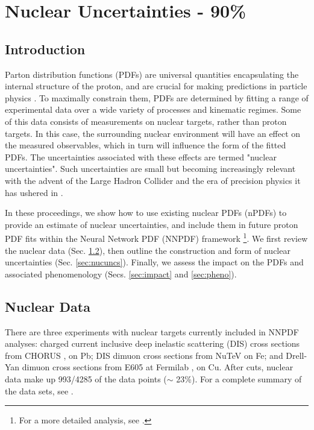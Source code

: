 \chapter{Nuclear Uncertainties - 90\%}
\section{Introduction}
%
Parton distribution functions (PDFs) are universal quantities encapsulating the internal structure of the proton, and are crucial for making predictions in particle physics \cite{Butterworth:2015oua}. To maximally constrain them, PDFs are determined by fitting a range of experimental data over a wide variety of processes and kinematic regimes. Some of this data consists of measurements on nuclear targets, rather than proton targets. In this case, the surrounding nuclear environment will have an effect on the measured observables, which in turn will influence the form of the fitted PDFs. The uncertainties associated with these effects are termed "nuclear uncertainties". Such uncertainties are small \cite{Ball:2009mk}\cite{Ball:2013gsa} but becoming increasingly relevant with the advent of the Large Hadron Collider and the era of precision physics it has ushered in \cite{Gao:2017yyd}.

In these proceedings, we show how to use existing nuclear PDFs (nPDFs) to provide an estimate of nuclear uncertainties, and include them in future proton PDF fits within the Neural Network PDF (NNPDF) framework \cite{Ball:2008by} \footnote{For a more detailed analysis, see \cite{Ball:2018twp}.}. We first review the nuclear data (Sec. \ref{sec:nucdat}), then outline the construction and form of nuclear uncertainties (Sec. \ref{sec:nucuncs}). Finally, we assess the impact on the PDFs and associated phenomenology (Secs. \ref{sec:impact} and \ref{sec:pheno}).
%
\section{Nuclear Data} \label{sec:nucdat}
%
There are three experiments with nuclear targets currently included in NNPDF analyses: 
charged current inclusive deep inelastic scattering (DIS) cross sections from CHORUS \cite{Onengut:2005kv}, on Pb; DIS dimuon cross sections from NuTeV \cite{Goncharov:2001qe}\cite{Tzanov:2005kr} on Fe; and Drell-Yan dimuon cross sections from E605 at Fermilab \cite{Aaltonen:2008eq}, on Cu. After cuts, nuclear data make up 993/4285 of the data points ($\sim$ 23\%). For a complete summary of the data sets, see \cite{Ball:2017nwa}.

